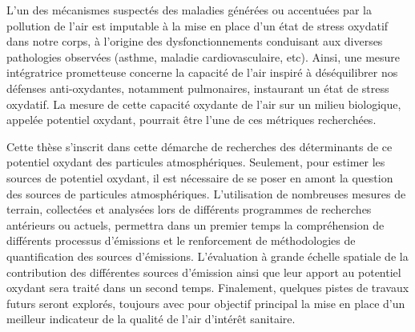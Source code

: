 L'un des mécanismes suspectés des maladies générées ou accentuées par la pollution de l'air
est imputable à la mise en place d'un état de stress oxydatif dans notre corps, à l'origine des
dysfonctionnements conduisant aux diverses pathologies observées (asthme, maladie
cardiovasculaire, etc). Ainsi, une mesure intégratrice prometteuse concerne la capacité de
l'air inspiré à déséquilibrer nos défenses anti-oxydantes, notamment pulmonaires, instaurant un état de stress oxydatif.
La mesure de cette capacité oxydante de l'air sur un milieu biologique, appelée potentiel oxydant, pourrait être
l'une de ces métriques recherchées.

Cette thèse s'inscrit dans cette démarche de recherches des déterminants de ce potentiel
oxydant des particules atmosphériques. Seulement, pour estimer les sources de potentiel
oxydant, il est nécessaire de se poser en amont la question des sources de particules
atmosphériques. L'utilisation de nombreuses mesures de terrain, collectées et analysées
lors de différents programmes de recherches antérieurs ou actuels, permettra dans un
premier temps la compréhension de différents processus d'émissions et le renforcement de
méthodologies de quantification des sources d'émissions. L'évaluation à grande échelle
spatiale de la contribution des différentes sources d'émission ainsi que leur apport au
potentiel oxydant sera traité dans un second temps. Finalement, quelques pistes de
travaux futurs seront explorés, toujours avec pour objectif principal la mise en place
d'un meilleur indicateur de la qualité de l'air d'intérêt sanitaire.


